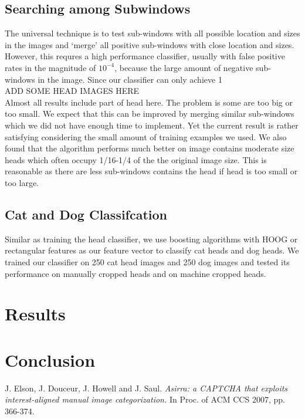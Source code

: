 \documentclass[12pt]{article}
\begin{document}
\subsection{Searching among Subwindows}

The universal technique is to test sub-windows with all possible location and sizes in the images and `merge' all positive sub-windows with close location and sizes. However, this requres a high performance classifier, usually with false positive rates in the magnitude of $10^{-4}$, because the large amount of negative sub-windows in the image. Since our classifier can only achieve 1\\
ADD SOME HEAD IMAGES HERE\\
Almost all results include part of head here. The problem is some are too big or too small. We expect that this can be improved by merging similar sub-windows which we did not have enough time to implement. Yet the current result is rather satisfying considering the small amount of training examples we used. We also found that the algorithm performs much better on image contains moderate size heads which often occupy 1/16-1/4 of the the original image size. This is reasonable as there are less sub-windows contains the head if head is too small or too large.
\subsection{Cat and Dog Classifcation}
Similar as training the head classifier, we use boosting algorithms with HOOG or rectangular features as our feature vector to classify cat heads and dog heads. We trained our classifier on 250 cat head images and 250 dog images and tested its performance on manually cropped heads and on machine cropped heads.

\section{Results}

\section{Conclusion}

\begin{thebibliography}{99}
 J. Elson, J. Douceur, J. Howell and J. Saul. \textit{Asirra: a CAPTCHA that exploits interest-aligned manual image categorization.} In Proc. of ACM CCS 2007, pp. 366-374.
\end{thebibliography}
\end{document}
